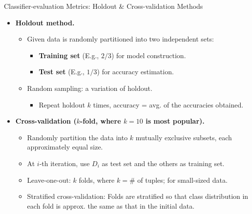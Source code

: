 \begin{frame}{Classifier-evaluation Metrics: Holdout \& Cross-validation Methods}
	\begin{itemize}
		\item \textbf{Holdout method.}
		      \begin{itemize}
			      \item Given data is randomly partitioned into two independent sets:
			            \begin{itemize}
				            \item \textbf{\color{airforceblue}Training set} (E.g., $2/3$) for model construction.
				            \item \textbf{\color{airforceblue}Test set} (E.g., $1/3$) for accuracy estimation.
			            \end{itemize}
			      \item Random sampling: a variation of holdout.
			            \begin{itemize}
				            \item Repeat holdout $k$ times, accuracy = avg. of the accuracies obtained.
			            \end{itemize}
		      \end{itemize}
		\item \textbf{{\color{airforceblue}Cross-validation} ($k$-fold, where $k = 10$ is most popular).}
		      \begin{itemize}
			      \item Randomly partition the data into $k$ mutually exclusive subsets, each approximately equal size.
			      \item At $i$-th iteration, use $D_i$ as test set and the others as training set.
			      \item Leave-one-out: $k$ folds, where $k = \#$ of tuples; for small-sized data.
			      \item Stratified cross-validation: Folds are stratified so that class distribution in each fold is approx. the same as that in the initial data.
		      \end{itemize}
	\end{itemize}
\end{frame}


